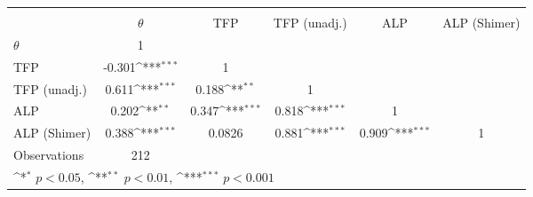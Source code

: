 {
\def\sym#1{\ifmmode^{#1}\else\(^{#1}\)\fi}
\begin{tabular}{l*{5}{c}}
\toprule
                &\multicolumn{5}{c}{}                                                                          \\
                & $\theta$         &      TFP         &TFP (unadj.)         &      ALP         &ALP (Shimer)         \\
\midrule
$\theta$        &        1         &                  &                  &                  &                  \\
TFP             &   -0.301\sym{***}&        1         &                  &                  &                  \\
TFP (unadj.)    &    0.611\sym{***}&    0.188\sym{**} &        1         &                  &                  \\
ALP             &    0.202\sym{**} &    0.347\sym{***}&    0.818\sym{***}&        1         &                  \\
ALP (Shimer)    &    0.388\sym{***}&   0.0826         &    0.881\sym{***}&    0.909\sym{***}&        1         \\
\midrule
Observations    &      212         &                  &                  &                  &                  \\
\bottomrule
\multicolumn{6}{l}{\footnotesize \sym{*} \(p<0.05\), \sym{**} \(p<0.01\), \sym{***} \(p<0.001\)}\\
\end{tabular}
}
